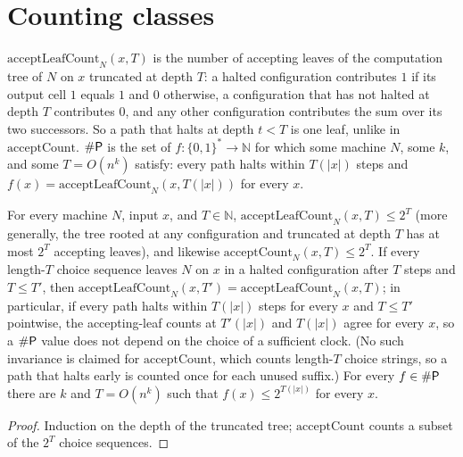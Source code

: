 \section{Counting classes}

\begin{definition}[$\#\cc{P}$]
  \label{def:sharpP}
  \leanok
  $\mathrm{acceptLeafCount}_N(x, T)$ is the number of accepting leaves of the
  computation tree of $N$ on $x$ truncated at depth $T$: a halted
  configuration contributes $1$ if its output cell $1$ equals $1$ and $0$
  otherwise, a configuration that has not halted at depth $T$ contributes $0$,
  and any other configuration contributes the sum over its two successors. So a
  path that halts at depth $t < T$ is one leaf, unlike in
  $\mathrm{acceptCount}$. $\#\cc{P}$ is the set of
  $f \colon \{0,1\}^* \to \mathbb{N}$ for which some machine $N$, some $k$, and
  some $T = O(n^k)$ satisfy: every path halts within $T(|x|)$ steps and
  $f(x) = \mathrm{acceptLeafCount}_N(x, T(|x|))$ for every $x$.
\end{definition}

\begin{lemma}
  \label{lem:randomness-leaf-count}
  \leanok
  For every machine $N$, input $x$, and $T \in \mathbb{N}$,
  $\mathrm{acceptLeafCount}_N(x, T) \le 2^T$ (more generally, the tree rooted
  at any configuration and truncated at depth $T$ has at most $2^T$ accepting
  leaves), and likewise $\mathrm{acceptCount}_N(x, T) \le 2^T$. If every
  length-$T$ choice sequence leaves $N$ on $x$ in a halted configuration after
  $T$ steps and $T \le T'$, then
  $\mathrm{acceptLeafCount}_N(x, T') = \mathrm{acceptLeafCount}_N(x, T)$; in
  particular, if every path halts within $T(|x|)$ steps for every $x$ and
  $T \le T'$ pointwise, the accepting-leaf counts at $T'(|x|)$ and $T(|x|)$
  agree for every $x$, so a $\#\cc{P}$ value does not depend on the choice of
  a sufficient clock. (No such invariance is claimed for
  $\mathrm{acceptCount}$, which counts length-$T$ choice strings, so a path
  that halts early is counted once for each unused suffix.) For every $f \in \#\mathsf{P}$ there are $k$ and $T = O(n^k)$ such that
  $f(x) \le 2^{T(|x|)}$ for every $x$.
\end{lemma}
\begin{proof}
  \leanok
  Induction on the depth of the truncated tree; $\mathrm{acceptCount}$ counts a
  subset of the $2^T$ choice sequences.
\end{proof}

